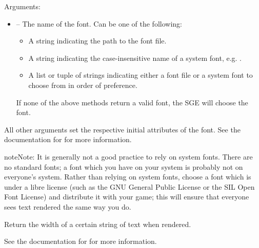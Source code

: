 \documentclass[letterpaper,10pt,english]{sphinxmanual}
\begin{document}
\begin{fulllineitems}
\label{gfx:sge.gfx.Font.__init__}
Arguments:
\begin{itemize}
\item {} 
 -- The name of the font.  Can be one of the
following:
\begin{itemize}
\item {} 
A string indicating the path to the font file.

\item {} 
A string indicating the case-insensitive name of a system
font, e.g. .

\item {} 
A list or tuple of strings indicating either a font file or
a system font to choose from in order of preference.

\end{itemize}

If none of the above methods return a valid font, the SGE will
choose the font.

\end{itemize}

All other arguments set the respective initial attributes of the
font.  See the documentation for {\hyperref[gfx:sge.gfx.Font]{\emph{}}} for more
information.

\begin{notice}{note}{Note:}
It is generally not a good practice to rely on system fonts.
There are no standard fonts; a font which you have on your
system is probably not on everyone's system.  Rather than
relying on system fonts, choose a font which is under a libre
license (such as the GNU General Public License or the SIL
Open Font License) and distribute it with your game; this
will ensure that everyone sees text rendered the same way you
do.
\end{notice}

\end{fulllineitems}


\begin{fulllineitems}
\label{gfx:sge.gfx.Font.get_width}
Return the width of a certain string of text when rendered.

See the documentation for {\hyperref[gfx:sge.gfx.Sprite.draw_text]{\emph{}}} for
more information.

\end{fulllineitems}
\end{document}
